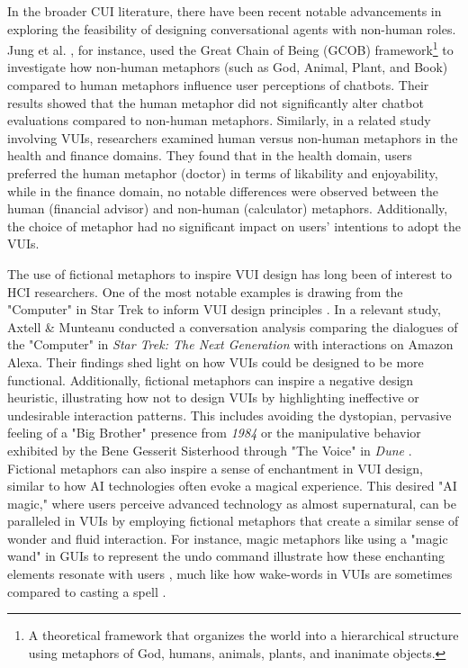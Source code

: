 In the broader CUI literature, there have been recent notable advancements in exploring the feasibility of designing conversational agents with non-human roles. Jung et al. \cite{Jung_Qiu_Bozzon_Gadiraju_2022}, for instance, used the Great Chain of Being (GCOB) framework\footnote{A theoretical framework that organizes the world into a hierarchical structure using metaphors of God, humans, animals, plants, and inanimate objects.} to investigate how non-human metaphors (such as God, Animal, Plant, and Book) compared to human metaphors influence user perceptions of chatbots. Their results showed that the human metaphor did not significantly alter chatbot evaluations compared to non-human metaphors. Similarly, in a related study involving VUIs, researchers examined human versus non-human metaphors in the health and finance domains. They found that in the health domain, users preferred the human metaphor (doctor) in terms of likability and enjoyability, while in the finance domain, no notable differences were observed between the human (financial advisor) and non-human (calculator) metaphors. Additionally, the choice of metaphor had no significant impact on users’ intentions to adopt the VUIs.

The use of fictional metaphors to inspire VUI design has long been of interest to HCI researchers. One of the most notable examples is drawing from the "Computer" in Star Trek to inform VUI design principles \cite{Turk_2016}. In a relevant study, Axtell \& Munteanu \cite{Axtell_Munteanu_2021} conducted a conversation analysis comparing the dialogues of the "Computer" in \textit{Star Trek: The Next Generation} with interactions on Amazon Alexa. Their findings shed light on how VUIs could be designed to be more functional. Additionally, fictional metaphors can inspire a negative design heuristic, illustrating how not to design VUIs by highlighting ineffective or undesirable interaction patterns. This includes avoiding the dystopian, pervasive feeling of a "Big Brother" presence from \textit{1984} or the manipulative behavior exhibited by the Bene Gesserit Sisterhood through "The Voice" in \textit{Dune} \cite{Feldman_2024}. Fictional metaphors can also inspire a sense of enchantment in VUI design, similar to how AI technologies often evoke a magical experience. This desired "AI magic," where users perceive advanced technology as almost supernatural, can be paralleled in VUIs by employing fictional metaphors that create a similar sense of wonder and fluid interaction. For instance, magic metaphors like using a "magic wand" in GUIs to represent the undo command illustrate how these enchanting elements resonate with users \cite{Lupetti_Murray-Rust_2024}, much like how wake-words in VUIs are sometimes compared to casting a spell \cite{Desai_Twidale_2023}.

